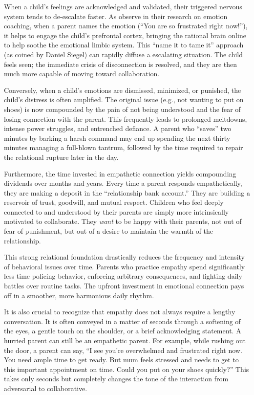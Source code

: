 When a child's feelings are acknowledged and validated, their triggered nervous system tends to de-escalate faster.
As \citet{gottman1997} observe in their research on emotion coaching, when a parent names the emotion (``You are so frustrated right now!''), it helps to engage the child's prefrontal cortex, bringing the rational brain online to help soothe the emotional limbic system.
This ``name it to tame it'' approach (as coined by Daniel Siegel) can rapidly diffuse a escalating situation.
The child feels seen; the immediate crisis of disconnection is resolved, and they are then much more capable of moving toward collaboration.

Conversely, when a child's emotions are dismissed, minimized, or punished, the child's distress is often amplified.
The original issue (e.g., not wanting to put on shoes) is now compounded by the pain of not being understood and the fear of losing connection with the parent.
This frequently leads to prolonged meltdowns, intense power struggles, and entrenched defiance.
A parent who ``saves'' two minutes by barking a harsh command may end up spending the next thirty minutes managing a full-blown tantrum, followed by the time required to repair the relational rupture later in the day.

Furthermore, the time invested in empathetic connection yields compounding dividends over months and years.
Every time a parent responds empathetically, they are making a deposit in the ``relationship bank account.''
They are building a reservoir of trust, goodwill, and mutual respect.
Children who feel deeply connected to and understood by their parents are simply more intrinsically motivated to collaborate.
They \textit{want} to be happy with their parents, not out of fear of punishment, but out of a desire to maintain the warmth of the relationship.

This strong relational foundation drastically reduces the frequency and intensity of behavioral issues over time.
Parents who practice empathy spend significantly less time policing behavior, enforcing arbitrary consequences, and fighting daily battles over routine tasks.
The upfront investment in emotional connection pays off in a smoother, more harmonious daily rhythm.

It is also crucial to recognize that empathy does not always require a lengthy conversation.
It is often conveyed in a matter of seconds through a softening of the eyes, a gentle touch on the shoulder, or a brief acknowledging statement.
A hurried parent can still be an empathetic parent.
For example, while rushing out the door, a parent can say, ``I see you're overwhelmed and frustrated right now.
You need ample time to get ready.
But mum feels stressed and needs to get to this important appointment on time.
Could you put on your shoes quickly?''
This takes only seconds but completely changes the tone of the interaction from adversarial to collaborative.


